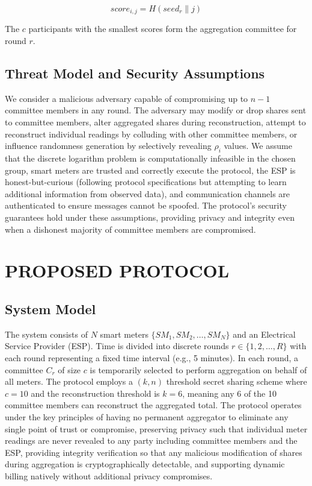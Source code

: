 \documentclass[conference]{IEEEtran}
\begin{document}
\begin{equation}
\mathit{score}_{i,j} = H(\mathit{seed}_r \parallel j)
\end{equation}

The $c$ participants with the smallest scores form the aggregation committee for round $r$.

\subsection{Threat Model and Security Assumptions}

We consider a malicious adversary capable of compromising up to $n-1$ committee members in any round. The adversary may modify or drop shares sent to committee members, alter aggregated shares during reconstruction, attempt to reconstruct individual readings by colluding with other committee members, or influence randomness generation by selectively revealing $\rho_i$ values. We assume that the discrete logarithm problem is computationally infeasible in the chosen group, smart meters are trusted and correctly execute the protocol, the ESP is honest-but-curious (following protocol specifications but attempting to learn additional information from observed data), and communication channels are authenticated to ensure messages cannot be spoofed. The protocol's security guarantees hold under these assumptions, providing privacy and integrity even when a dishonest majority of committee members are compromised.

\section{PROPOSED PROTOCOL}

\subsection{System Model}

The system consists of $N$ smart meters $\{SM_1, SM_2, \ldots, SM_N\}$ and an Electrical Service Provider (ESP). Time is divided into discrete rounds $r \in \{1,2,\ldots,R\}$ with each round representing a fixed time interval (e.g., 5 minutes). In each round, a committee $C_r$ of size $c$ is temporarily selected to perform aggregation on behalf of all meters. The protocol employs a $(k,n)$ threshold secret sharing scheme where $c = 10$ and the reconstruction threshold is $k = 6$, meaning any 6 of the 10 committee members can reconstruct the aggregated total. The protocol operates under the key principles of having no permanent aggregator to eliminate any single point of trust or compromise, preserving privacy such that individual meter readings are never revealed to any party including committee members and the ESP, providing integrity verification so that any malicious modification of shares during aggregation is cryptographically detectable, and supporting dynamic billing natively without additional privacy compromises.
\end{document}
